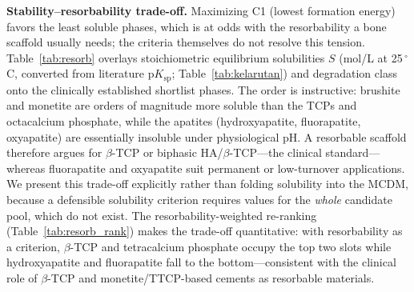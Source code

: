 \documentclass[11pt,a4paper]{article}
\begin{document}
\textbf{Stability--resorbability trade-off.} Maximizing C1 (lowest formation energy) favors the least soluble phases, which is at odds with the resorbability a bone scaffold usually needs; the criteria themselves do not resolve this tension. Table~\ref{tab:resorb} overlays stoichiometric equilibrium solubilities $S$ (mol/L at 25\,$^\circ$C, converted from literature p$K_\mathrm{sp}$; Table~\ref{tab:kelarutan}) and degradation class~\cite{elliott1994,dorozhkin2009,wang2008} onto the clinically established shortlist phases. The order is instructive: brushite and monetite are orders of magnitude more soluble than the TCPs and octacalcium phosphate, while the apatites (hydroxyapatite, fluorapatite, oxyapatite) are essentially insoluble under physiological pH. A resorbable scaffold therefore argues for $\beta$-TCP or biphasic HA/$\beta$-TCP---the clinical standard---whereas fluorapatite and oxyapatite suit permanent or low-turnover applications. We present this trade-off explicitly rather than folding solubility into the MCDM, because a defensible solubility criterion requires values for the \emph{whole} candidate pool, which do not exist. The resorbability-weighted re-ranking (Table~\ref{tab:resorb_rank}) makes the trade-off quantitative: with resorbability as a criterion, $\beta$-TCP and tetracalcium phosphate occupy the top two slots while hydroxyapatite and fluorapatite fall to the bottom---consistent with the clinical role of $\beta$-TCP and monetite/TTCP-based cements as resorbable materials.
\end{document}
